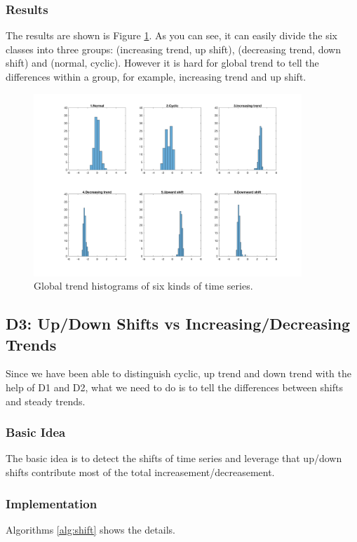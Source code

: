 \documentclass[a4paper]{article}
\begin{document}
\subsubsection{Results}
The results are shown is Figure \ref{fig:gt}. As you can see, it can easily divide the six classes into three groups: (increasing trend, up shift), (decreasing trend, down shift) and (normal, cyclic). However it is hard for global trend to tell the differences within a group, for example, increasing trend and up shift.

\begin{figure}[htbp]
\centering
\includegraphics[width=0.9\textwidth]{gt.png}
\caption{\label{fig:gt}Global trend histograms of six kinds of time series.}
\end{figure}

\subsection{D3: Up/Down Shifts vs Increasing/Decreasing Trends}
Since we have been able to distinguish cyclic, up trend and down trend with the help of D1 and D2, what we need to do is to tell the differences between shifts and steady trends.
\subsubsection{Basic Idea}
The basic idea is to detect the shifts of time series and leverage that up/down shifts contribute most of the total increasement/decreasement.

\subsubsection{Implementation}
Algorithms \ref{alg:shift} shows the details.
\end{document}
